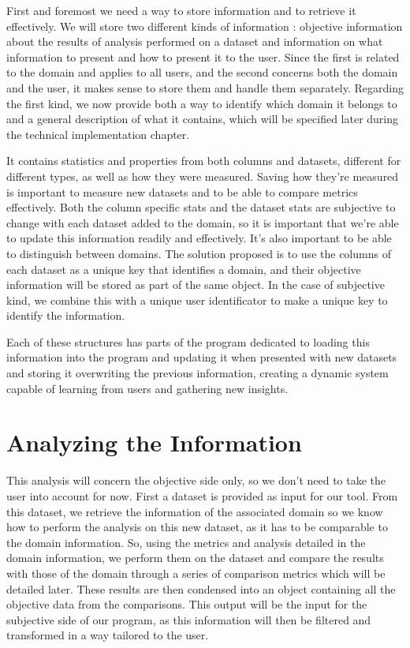 First and foremost we need a way to store information and to retrieve it effectively. We will store two different kinds of information : objective information about the results of analysis performed on a dataset and information on what information to present and how to present it to the user.
Since the first is related to the domain and applies to all users, and the second concerns both the domain and the user, it makes sense to store them and handle them separately.
Regarding the first kind, we now provide both a way to identify which domain it belongs to and a general description of what it contains, which will be specified later during the technical implementation chapter.

It contains statistics and properties from both columns and datasets, different for different types, as well as how they were measured. Saving how they're measured is important to measure new datasets and to be able to compare metrics effectively.
Both the column specific stats and the dataset stats are subjective to change with each dataset added to the domain, so it is important that we're able to update this information readily and effectively.
It's also important to be able to distinguish between domains. The solution proposed is to use the columns of each dataset as a unique key that identifies a domain, and their objective information will be stored as part of the same object.
In the case of subjective kind, we combine this with a unique user identificator to make a unique key to identify the information.

Each of these structures has parts of the program dedicated to loading this information into the program and updating it when presented with new datasets and storing it overwriting the previous information, creating a dynamic system capable of learning from users and gathering new insights.

\section{Analyzing the Information}
\label{cap2:sec:analysis}

This analysis will concern the objective side only, so we don't need to take the user into account for now.
First a dataset is provided as input for our tool. From this dataset, we retrieve the information of the associated domain so we know how to perform the analysis on this new dataset, as it has to be comparable to the domain information.
So, using the metrics and analysis detailed in the domain information, we perform them on the dataset and compare the results with those of the domain through a series of comparison metrics which will be detailed later.
These results are then condensed into an object containing all the objective data from the comparisons.
This output will be the input for the subjective side of our program, as this information will then be filtered and transformed in a way tailored to the user.

